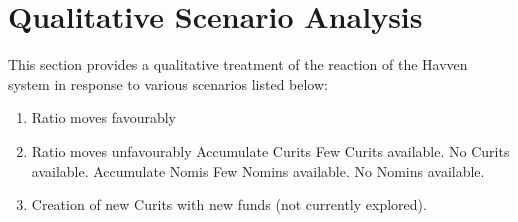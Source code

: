 
\section{Qualitative Scenario Analysis}

This section provides a qualitative treatment of the reaction of the Havven system in response to various scenarios listed below:

\begin{enumerate}
	\item Ratio moves favourably
	\item Ratio moves unfavourably
		\subitem Accumulate Curits
			\subsubitem Few Curits available.
			\subsubitem No Curits available.
		\subitem Accumulate Nomis
			\subsubitem Few Nomins available.
			\subsubitem No Nomins available.
	\item Creation of new Curits with new funds (not currently explored).
\end{enumerate}

\pagebreak